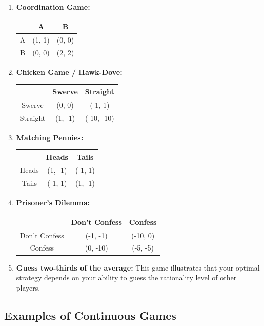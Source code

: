 \begin{enumerate}
    \item \textbf{Coordination Game:}
    \begin{center}
    \begin{tabular}{c|c|c}
     & A & B \\ \hline
    A & (1, 1) & (0, 0) \\ \hline
    B & (0, 0) & (2, 2)
    \end{tabular}
    \end{center}

    \item \textbf{Chicken Game / Hawk-Dove:}
    \begin{center}
    \begin{tabular}{c|c|c}
     & Swerve & Straight \\ \hline
    Swerve & (0, 0) & (-1, 1) \\ \hline
    Straight & (1, -1) & (-10, -10)
    \end{tabular}
    \end{center}

    \item \textbf{Matching Pennies:}
    \begin{center}
    \begin{tabular}{c|c|c}
     & Heads & Tails \\ \hline
    Heads & (1, -1) & (-1, 1) \\ \hline
    Tails & (-1, 1) & (1, -1)
    \end{tabular}
    \end{center}

    \item \textbf{Prisoner's Dilemma:}
    \begin{center}
    \begin{tabular}{c|c|c}
     & Don't Confess & Confess \\ \hline
    Don't Confess & (-1, -1) & (-10, 0) \\ \hline
    Confess & (0, -10) & (-5, -5)
    \end{tabular}
    \end{center}

    \item \textbf{Guess two-thirds of the average:}
    This game illustrates that your optimal strategy depends on your ability to guess the rationality level of other players.
\end{enumerate}

\subsection{Examples of Continuous Games}

